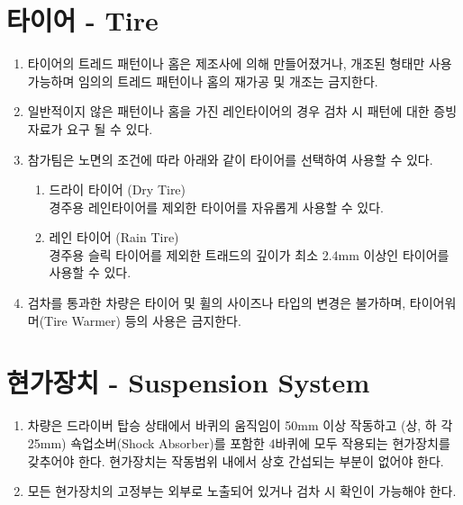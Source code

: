 \documentclass[final,a4paper,10pt]{report}
\begin{document}
\section{타이어 - Tire}
\begin{enumerate}
  \item 타이어의 트레드 패턴이나 홈은 제조사에 의해 만들어졌거나, 개조된 형태만 사용 가능하며 임의의 트레드 패턴이나 홈의 재가공 및 개조는 금지한다.
  \item 일반적이지 않은 패턴이나 홈을 가진 레인타이어의 경우 검차 시 패턴에 대한 증빙자료가 요구 될 수 있다.
  
  \item 참가팀은 노면의 조건에 따라 아래와 같이 타이어를 선택하여 사용할 수 있다.
    \begin{enumerate}
      \item 드라이 타이어 (Dry Tire)\\
        경주용 레인타이어를 제외한 타이어를 자유롭게 사용할 수 있다.
      \item 레인 타이어 (Rain Tire)\\
        경주용 슬릭 타이어를 제외한 트래드의 깊이가 최소 2.4mm 이상인 타이어를 사용할 수 있다.
    \end{enumerate}
    
  \item 검차를 통과한 차량은 타이어 및 휠의 사이즈나 타입의 변경은 불가하며, 타이어워머(Tire Warmer) 등의 사용은 금지한다.
\end{enumerate}

\section{현가장치 - Suspension System}
\begin{enumerate}
  \item 차량은 드라이버 탑승 상태에서 바퀴의 움직임이 50mm 이상 작동하고 (상, 하 각 25mm) 쇽업소버(Shock Absorber)를 포함한 4바퀴에 모두 작용되는 현가장치를 갖추어야 한다. 현가장치는 작동범위 내에서 상호 간섭되는 부분이 없어야 한다.
  \item 모든 현가장치의 고정부는 외부로 노출되어 있거나 검차 시 확인이 가능해야 한다.
\end{enumerate}
\end{document}
